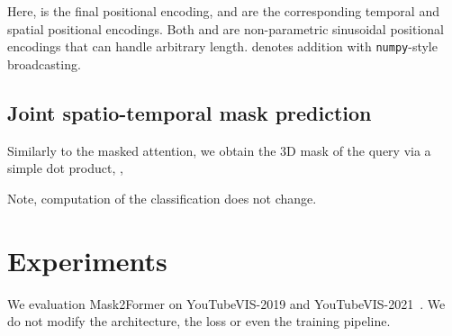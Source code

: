 \documentclass[10pt,twocolumn,letterpaper]{article}
\newcommand{\modelname}{Mask2Former\xspace}
\begin{document}
Here,  is the final positional encoding,  and  are the corresponding temporal and spatial positional encodings. Both  and  are non-parametric sinusoidal positional encodings that can handle arbitrary length.  denotes addition with \texttt{numpy}-style broadcasting.

\subsection{Joint spatio-temporal mask prediction}

Similarly to the masked attention, we obtain the 3D mask of the  query via a simple dot product, \ie, 

Note, computation of the classification  does not change.

\section{Experiments}
We evaluation \modelname on YouTubeVIS-2019 and YouTubeVIS-2021~\cite{yang2019video}. We do not modify the architecture, the loss or even the training pipeline.
\end{document}
